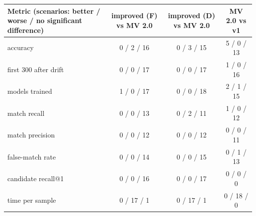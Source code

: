 \renewcommand{\arraystretch}{1.2}\begin{tabular}{@{}lccc@{}}\toprule
\textbf{Metric (scenarios: better / worse / no significant difference)} & \textbf{improved (F) vs MV 2.0} & \textbf{improved (D) vs MV 2.0} & \textbf{MV 2.0 vs v1}\\\midrule
accuracy & 0 / 2 / 16 & 0 / 3 / 15 & 5 / 0 / 13 \\
first 300 after drift & 0 / 0 / 17 & 0 / 0 / 17 & 1 / 0 / 16 \\
models trained & 1 / 0 / 17 & 0 / 0 / 18 & 2 / 1 / 15 \\
match recall & 0 / 0 / 13 & 0 / 2 / 11 & 1 / 0 / 12 \\
match precision & 0 / 0 / 12 & 0 / 0 / 12 & 0 / 0 / 11 \\
false-match rate & 0 / 0 / 14 & 0 / 0 / 15 & 0 / 1 / 13 \\
candidate recall@1 & 0 / 0 / 16 & 0 / 0 / 17 & 0 / 0 / 0 \\
time per sample & 0 / 17 / 1 & 0 / 17 / 1 & 0 / 18 / 0 \\
\bottomrule\end{tabular}
